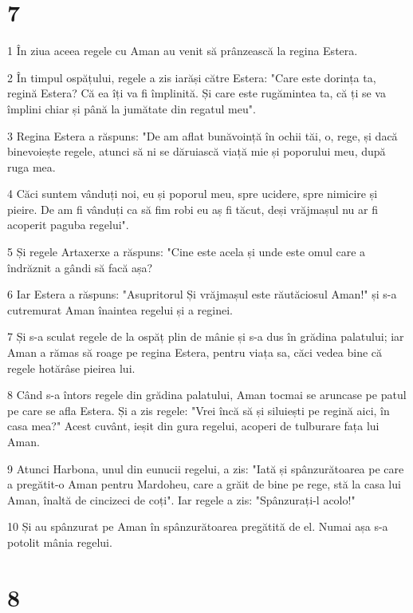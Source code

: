\chapter{7}

\par 1 În ziua aceea regele cu Aman au venit să prânzească la regina Estera.
\par 2 În timpul ospățului, regele a zis iarăși către Estera: "Care este dorința ta, regină Estera? Că ea îți va fi împlinită. Și care este rugămintea ta, că ți se va împlini chiar și până la jumătate din regatul meu".
\par 3 Regina Estera a răspuns: "De am aflat bunăvoință în ochii tăi, o, rege, și dacă binevoiește regele, atunci să ni se dăruiască viață mie și poporului meu, după ruga mea.
\par 4 Căci suntem vânduți noi, eu și poporul meu, spre ucidere, spre nimicire și pieire. De am fi vânduți ca să fim robi eu aș fi tăcut, deși vrăjmașul nu ar fi acoperit paguba regelui".
\par 5 Și regele Artaxerxe a răspuns: "Cine este acela și unde este omul care a îndrăznit a gândi să facă așa?
\par 6 Iar Estera a răspuns: "Asupritorul Și vrăjmașul este răutăciosul Aman!" și s-a cutremurat Aman înaintea regelui și a reginei.
\par 7 Și s-a sculat regele de la ospăț plin de mânie și s-a dus în grădina palatului; iar Aman a rămas să roage pe regina Estera, pentru viața sa, căci vedea bine că regele hotărâse pieirea lui.
\par 8 Când s-a întors regele din grădina palatului, Aman tocmai se aruncase pe patul pe care se afla Estera. Și a zis regele: "Vrei încă să și siluiești pe regină aici, în casa mea?" Acest cuvânt, ieșit din gura regelui, acoperi de tulburare fața lui Aman.
\par 9 Atunci Harbona, unul din eunucii regelui, a zis: "Iată și spânzurătoarea pe care a pregătit-o Aman pentru Mardoheu, care a grăit de bine pe rege, stă la casa lui Aman, înaltă de cincizeci de coți". Iar regele a zis: "Spânzurați-l acolo!"
\par 10 Și au spânzurat pe Aman în spânzurătoarea pregătită de el. Numai așa s-a potolit mânia regelui.

\chapter{8}

